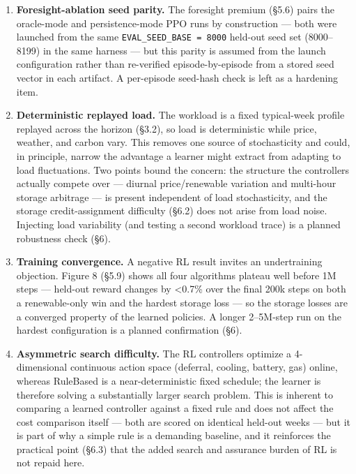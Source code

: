 \documentclass[
  11pt,
]{article}
\begin{document}
\begin{enumerate}
{  authority} over one state dimension but does \textbf{not} violate the
  Markov property: the observation includes SoC, current renewable
  availability, and current demand, so the SoC transition is a
  deterministic function of the observed state and action --- even
  though the agent's battery action alone does not uniquely determine
  it.
\item
  \textbf{Foresight-ablation seed parity.} The foresight premium (§5.6)
  pairs the oracle-mode and persistence-mode PPO runs by construction
  --- both were launched from the same
  \texttt{EVAL\_SEED\_BASE\ =\ 8000} held-out seed set (8000--8199) in
  the same harness --- but this parity is assumed from the launch
  configuration rather than re-verified episode-by-episode from a stored
  seed vector in each artifact. A per-episode seed-hash check is left as
  a hardening item.
\item
  \textbf{Deterministic replayed load.} The workload is a fixed
  typical-week profile replayed across the horizon (§3.2), so load is
  deterministic while price, weather, and carbon vary. This removes one
  source of stochasticity and could, in principle, narrow the advantage
  a learner might extract from adapting to load fluctuations. Two points
  bound the concern: the structure the controllers actually compete over
  --- diurnal price/renewable variation and multi-hour storage arbitrage
  --- is present independent of load stochasticity, and the storage
  credit-assignment difficulty (§6.2) does not arise from load noise.
  Injecting load variability (and testing a second workload trace) is a
  planned robustness check (§6).
\item
  \textbf{Training convergence.} A negative RL result invites an
  undertraining objection. Figure 8 (§5.9) shows all four algorithms
  plateau well before 1M steps --- held-out reward changes by
  \textless0.7\% over the final 200k steps on both a renewable-only win
  and the hardest storage loss --- so the storage losses are a converged
  property of the learned policies. A longer 2--5M-step run on the
  hardest configuration is a planned confirmation (§6).
\item
  \textbf{Asymmetric search difficulty.} The RL controllers optimize a
  4-dimensional continuous action space (deferral, cooling, battery,
  gas) online, whereas RuleBased is a near-deterministic fixed schedule;
  the learner is therefore solving a substantially larger search
  problem. This is inherent to comparing a learned controller against a
  fixed rule and does not affect the cost comparison itself --- both are
  scored on identical held-out weeks --- but it is part of why a simple
  rule is a demanding baseline, and it reinforces the practical point
  (§6.3) that the added search and assurance burden of RL is not repaid
  here.
\end{enumerate}
\end{document}
